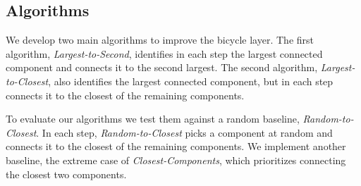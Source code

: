 \subsection{Algorithms}
We develop two main algorithms to improve the bicycle layer. The first algorithm, \textit{Largest-to-Second}, identifies in each step the largest connected component and connects it to the second largest. The second algorithm, \textit{Largest-to-Closest}, also identifies the largest connected component, but in each step connects it to the closest of the remaining components.

To evaluate our algorithms we test them against a random baseline, \textit{Random-to-Closest}. In each step, \textit{Random-to-Closest} picks a component at random and connects it to the closest of the remaining components. We implement another baseline, the extreme case of \textit{Closest-Components}, which prioritizes connecting the closest two components.



